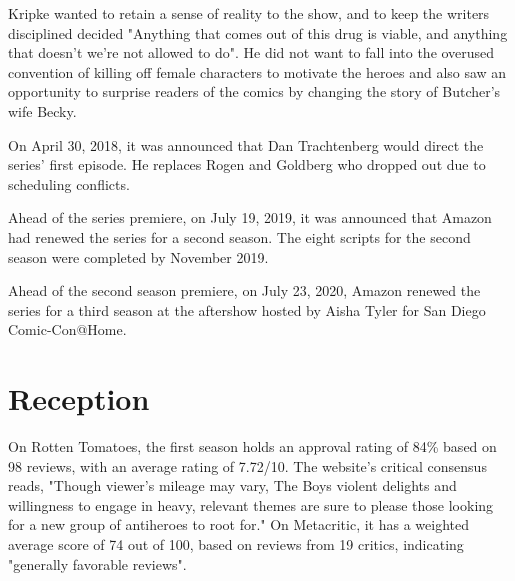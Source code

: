 \documentclass[12pt]{article}
\begin{document}
Kripke wanted to retain a sense of reality to the show, and to keep the writers disciplined decided "Anything that comes out of this drug is viable, and anything that doesn't we're not allowed to do". He did not want to fall into the overused convention of killing off female characters to motivate the heroes and also saw an opportunity to surprise readers of the comics by changing the story of Butcher's wife Becky.

On April 30, 2018, it was announced that Dan Trachtenberg would direct the series' first episode. He replaces Rogen and Goldberg who dropped out due to scheduling conflicts.

Ahead of the series premiere, on July 19, 2019, it was announced that Amazon had renewed the series for a second season. The eight scripts for the second season were completed by November 2019.

Ahead of the second season premiere, on July 23, 2020, Amazon renewed the series for a third season at the aftershow hosted by Aisha Tyler for San Diego Comic-Con@Home.

\section{Reception}
On Rotten Tomatoes, the first season holds an approval rating of 84\% based on 98 reviews, with an average rating of 7.72/10. The website's critical consensus reads, "Though viewer's mileage may vary, The Boys violent delights and willingness to engage in heavy, relevant themes are sure to please those looking for a new group of antiheroes to root for." On Metacritic, it has a weighted average score of 74 out of 100, based on reviews from 19 critics, indicating "generally favorable reviews".
\end{document}

